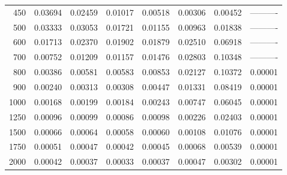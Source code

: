 \begin{table}[ht]
\begin{tabular}{r|c|c|c|c|c|c|c}
      450 & 0.03694 & 0.02459 & 0.01017 & 0.00518 & 0.00306 & 0.00452 & ---------- \\
      500 & 0.03333 & 0.03053 & 0.01721 & 0.01155 & 0.00963 & 0.01838 & ---------- \\
      600 & 0.01713 & 0.02370 & 0.01902 & 0.01879 & 0.02510 & 0.06918 & ---------- \\
      700 & 0.00752 & 0.01209 & 0.01157 & 0.01476 & 0.02803 & 0.10348 & ---------- \\
      800 & 0.00386 & 0.00581 & 0.00583 & 0.00853 & 0.02127 & 0.10372 & 0.00001 \\
      900 & 0.00240 & 0.00313 & 0.00308 & 0.00447 & 0.01331 & 0.08419 & 0.00001 \\
     1000 & 0.00168 & 0.00199 & 0.00184 & 0.00243 & 0.00747 & 0.06045 & 0.00001 \\
     1250 & 0.00096 & 0.00099 & 0.00086 & 0.00098 & 0.00226 & 0.02403 & 0.00001 \\
     1500 & 0.00066 & 0.00064 & 0.00058 & 0.00060 & 0.00108 & 0.01076 & 0.00001 \\
     1750 & 0.00051 & 0.00047 & 0.00042 & 0.00045 & 0.00068 & 0.00539 & 0.00001 \\
     2000 & 0.00042 & 0.00037 & 0.00033 & 0.00037 & 0.00047 & 0.00302 & 0.00001 \\ \cline{1-8}
    \end{tabular}
    \label{tab:XRayEffSDE4}
\end{table}